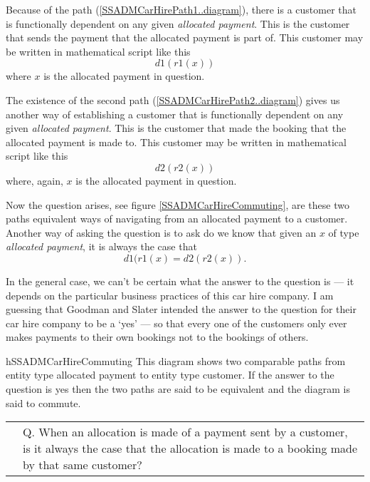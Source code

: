 Because of the path (\ref{SSADMCarHirePath1..diagram}),
there is a customer that is functionally dependent on any 
given  \textit{allocated payment}. This is the customer that sends the payment that the allocated payment is part of. This customer may be written in mathematical script like this
\begin{equation*}
d1(r1(x))
\end{equation*}
where $x$ is the allocated payment in question. 

The existence of the second path (\ref{SSADMCarHirePath2..diagram}) gives us another 
way of establishing a customer that is functionally dependent on any 
given  \textit{allocated payment}. This is the customer that made the booking
that the allocated payment is made to. This customer may be written in mathematical script like this
\begin{equation*}
d2(r2(x))
\end{equation*}
where, again, $x$ is the allocated payment in question. 

\mynote
Now the question arises, see figure \ref{SSADMCarHireCommuting}, are these two paths equivalent ways of navigating from an allocated payment to a customer. 
Another way of asking the question is to ask 
do we know that given an $x$ of type \textit{allocated  payment}, it is always the case that
\begin{equation*}
d1(r1(x) = d2(r2(x)).
\end{equation*}

\mynote
In the general case, we can't be certain what the answer to the question is ---
it depends on the particular business practices of this car hire company. 
I am guessing that Goodman and Slater intended the answer to the question for their car hire company to be a `yes' ---  so that every one of the customers only ever makes payments to their own bookings not to the bookings of others.

\begin{erboxedFigure}{h}{SSADMCarHireCommuting}
{
This diagram  shows two comparable paths from entity type allocated payment to entity type customer. If the answer to the question is yes then  the two paths are said to be equivalent and the diagram is said to commute.}
\begin{tabular}{c  p{5.5cm}}
\raisebox{-2.8cm}{\scalebox{0.9}
{}}
&
Q. When an allocation is made of a payment sent by a customer, is it always the case that
the allocation is made to a booking made by that same customer? \\[0.2cm]
\end{tabular} 
\end{erboxedFigure}

